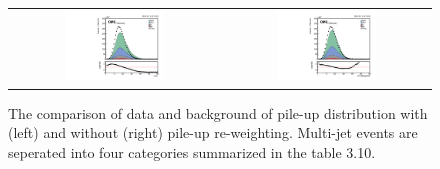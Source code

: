 \begin{figure}[t]
  \centering
  \begin{tabular}{cc}
    \includegraphics[width=0.5\textwidth]{Figures/dataMC_trig/nVtx.pdf} &
    \includegraphics[width=0.5\textwidth]{Figures/dataMC_trig/nVtxWeighted.pdf} \\
    
  \end{tabular}
  \caption{The comparison of data and background of pile-up distribution with (left) and without (right) pile-up re-weighting. Multi-jet events are seperated into four categories summarized in the table 3.10.}
\end{figure}
